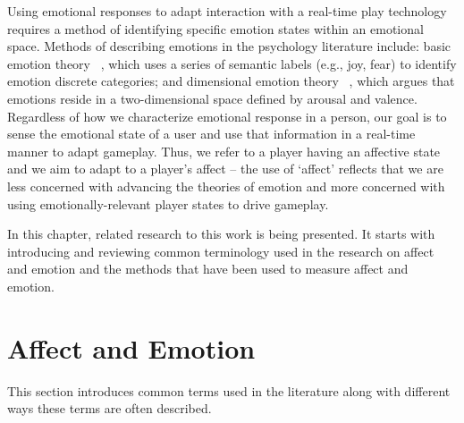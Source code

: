 

Using emotional responses to adapt interaction with a real-time play technology requires a method of identifying specific emotion states within an emotional space. Methods of describing emotions in the psychology literature include: basic emotion theory ~\cite{ekman1992argument, ekman1992there}, which uses a series of semantic labels (e.g., joy, fear) to identify emotion discrete categories; and dimensional emotion theory ~\cite{lang1995emotion, russell1989affect}, which argues that emotions reside in a two-dimensional space defined by arousal and valence. Regardless of how we characterize emotional response in a person, our goal is to sense the emotional state of a user and use that information in a real-time manner to adapt gameplay. Thus, we refer to a player having an affective state and we aim to adapt to a player’s affect – the use of ‘affect’ reflects that we are less concerned with advancing the theories of emotion and more concerned with using emotionally-relevant player states to drive gameplay.

In this chapter, related research to this work is being presented. It starts with introducing and reviewing common terminology used in the research on affect and emotion and the methods that have been used to measure affect and emotion.

\section{Affect and Emotion}

This section introduces common terms used in the literature along with different ways these terms are often described.

